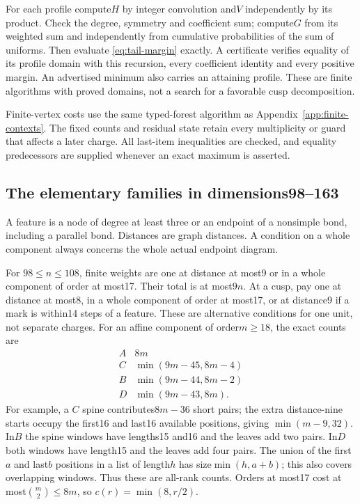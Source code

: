 \documentclass[11pt]{article}
\theoremstyle{remark}\newtheorem{remark}[theorem]{Remark}
\begin{document}
For each profile compute$H$ by integer convolution and$V$ independently
by its product. Check the degree, symmetry and coefficient sum;
compute$G$ from its weighted sum and independently from cumulative
probabilities of the sum of uniforms. Then evaluate
\eqref{eq:tail-margin} exactly. A certificate verifies equality of its
profile domain with this recursion, every coefficient identity and
every positive margin. An advertised minimum also carries an attaining
profile. These are finite algorithms with proved domains, not a
search for a favorable cusp decomposition.

Finite-vertex costs use the same typed-forest algorithm as
Appendix~\ref{app:finite-contexts}. The fixed counts and residual
state retain every multiplicity or guard that affects a later charge.
All last-item inequalities are checked, and equality predecessors
are supplied whenever an exact maximum is asserted.

\subsection{The elementary families in dimensions98--163}

A feature is a node of degree at least three or an endpoint of a
nonsimple bond, including a parallel bond. Distances are graph
distances. A condition on a whole component always concerns the
whole actual endpoint diagram.

For $98\le n\le108$, finite weights are one at distance at most9
or in a whole component of order at most17. Their total is at most$9n$.
At a cusp, pay one at distance at most8, in a whole component of
order at most17, or at distance9 if a mark is within14 steps of
a feature. These are alternative conditions for one unit, not
separate charges. For an affine component of order$m\ge18$, the
exact counts are
\[
 \begin{array}{c|c}
 A&8m\\ C&\min(9m-45,8m-4)\\
 B&\min(9m-44,8m-2)\\D&\min(9m-43,8m).
 \end{array}
\]
For example, a $C$ spine contributes$8m-36$ short pairs; the extra
distance-nine starts occupy the first16 and last16 available positions,
giving $\min(m-9,32)$. In$B$ the spine windows have lengths15 and16
and the leaves add two pairs. In$D$ both windows have length15 and
the leaves add four pairs. The union of the first$a$ and last$b$
positions in a list of length$h$ has size$\min(h,a+b)$; this also
covers overlapping windows. Thus these are all-rank counts.
Orders at most17 cost at most$\binom m2\le8m$, so
$c(r)=\min(8,r/2)$.
\end{document}
